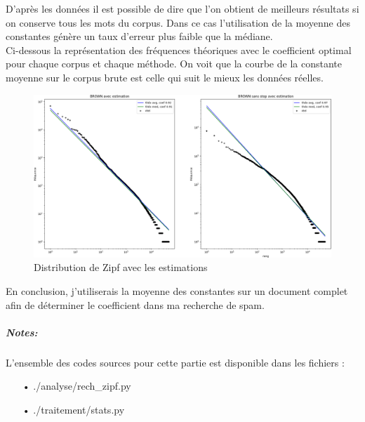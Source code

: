 \documentclass[a4paper,12pt]{article}
\begin{document}
		D'après les données il est possible de dire que l'on obtient de meilleurs résultats si on conserve tous les mots du corpus. Dans ce cas l'utilisation de la moyenne des constantes génère un taux d'erreur plus faible que la médiane.\\
		
		Ci-dessous la représentation des fréquences théoriques avec le coefficient optimal pour chaque corpus et chaque méthode. On voit que la courbe de la constante moyenne sur le corpus brute est celle qui suit le mieux les données réelles.
		\begin{figure}[H]
			\includegraphics[width=\linewidth]{img/zipfFin.png}
			\caption{Distribution de Zipf avec les estimations}
		\end{figure}
		
		En conclusion, j'utiliserais la moyenne des constantes sur un document complet afin de déterminer le coefficient dans ma recherche de spam. 
		
		\subparagraph{Notes:}
			L'ensemble des codes sources pour cette partie est disponible dans les fichiers :
			\begin{itemize}
				\item[•]./analyse/rech\_zipf.py
				\item[•] ./traitement/stats.py
			\end{itemize}

\newpage
\end{document}
